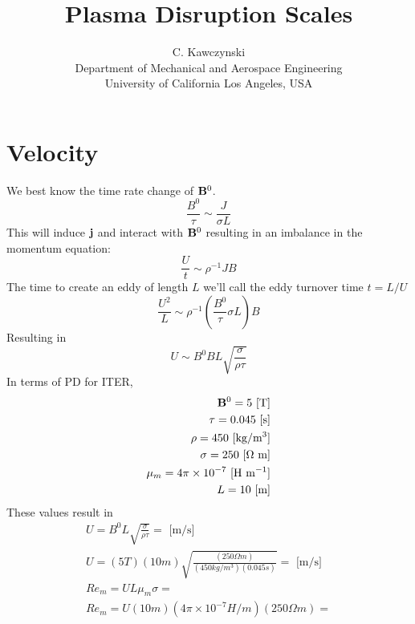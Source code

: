 \documentclass[11pt]{article}
\begin{document}
\doublespacing
\title{Plasma Disruption Scales}
\author{C. Kawczynski \\
Department of Mechanical and Aerospace Engineering \\
University of California Los Angeles, USA\\
}
\maketitle

\section{Velocity}
We best know the time rate change of $\mathbf{B}^0$. 
\begin{equation}
	\frac{B^0}{\tau} \sim \frac{J}{\sigma L}
\end{equation}
This will induce $\mathbf{j}$ and interact with $\mathbf{B}^0$ resulting in an imbalance in the momentum equation:
\begin{equation}
	\frac{U}{t} \sim \rho^{-1} J B
\end{equation}
The time to create an eddy of length $L$ we'll call the eddy turnover time $t=L/U$
\begin{equation}
	\frac{U^2}{L} \sim \rho^{-1} \left(\frac{B^0}{\tau} \sigma L \right) B
\end{equation}
Resulting in
\begin{equation}
	U \sim {B^0} B L \sqrt{\frac{\sigma}{\rho \tau}}
\end{equation}
In terms of PD for ITER,
\begin{equation}\begin{aligned}
	\mathbf{B}^0 = 5 \text{ [T]} \\
	\tau = 0.045 \text{ [s]} \\
	\rho = 450 \text{ [kg/m$^3$]} \\
	\sigma = 250 \text{ [$\Omega$ m]} \\
	\mu_m = 4 \pi \times 10^{-7} \text{ [H m$^{-1}$]} \\
	L = 10 \text{ [m]} \\
\end{aligned}\end{equation}
These values result in
\begin{equation}\begin{aligned}
	U = B^0 L \sqrt{\frac{\sigma}{\rho \tau}} = \text{ [m/s]} \\
	U = (5 T) (10 m) \sqrt{\frac{(250 \Omega m)}{(450 kg/m^3) (0.045 s)}} = \text{ [m/s]} \\
	Re_m = U L \mu_m \sigma =  \\
	Re_m = U (10 m) (4 \pi \times 10^{-7} H/m) (250 \Omega m) =  \\
\end{aligned}\end{equation}
\end{document}
